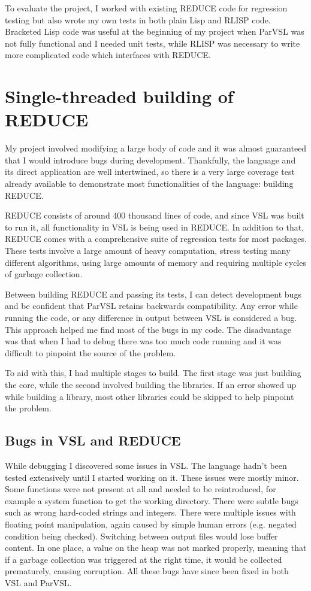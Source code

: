 To evaluate the project, I worked with existing REDUCE code for regression testing
but also wrote my own tests in both plain Lisp and RLISP code.
Bracketed Lisp code was useful at the beginning of my project when ParVSL was not
fully functional and I needed unit tests, while RLISP was necessary to write
more complicated code which interfaces with REDUCE.

\section{Single-threaded building of REDUCE}

My project involved modifying a large body of code and it was almost guaranteed
that I would introduce bugs during development. Thankfully, the language and its
direct application are well intertwined, so there is a very large coverage test already
available to demonstrate most functionalities of the language: building REDUCE.

REDUCE consists of around 400 thousand lines of code, and since VSL was built to
run it, all functionality in VSL is being used in REDUCE. In addition to that,
REDUCE comes with a comprehensive suite of regression tests for most packages.
These tests involve a large amount of heavy computation, stress testing
many different algorithms, using large amounts of memory and requiring multiple cycles
of garbage collection.

Between building REDUCE and passing its tests, I can detect development bugs and be
confident that ParVSL retains backwards compatibility. Any error while running the code,
or any difference in output between VSL is considered a bug. This approach helped me
find most of the bugs in my code. The disadvantage was that when I had to debug there
was too much code running and it was difficult to pinpoint the source of the problem.

To aid with this, I had multiple stages to build. The first stage was just building
the core, while the second involved building the libraries. If an error showed up while
building a library, most other libraries could be skipped to help pinpoint the problem.

\subsection{Bugs in VSL and REDUCE}

While debugging I discovered some issues in VSL. The language hadn't been tested
extensively until I started working on it. These issues were mostly minor. Some functions
were not present at all and needed to be reintroduced, for example a system function to get
the working directory. There were subtle bugs such as wrong
hard-coded strings and integers. There were multiple issues with floating point manipulation,
again caused by simple human errors (e.g. negated condition being checked). Switching between
output files would lose buffer content. In one place, a value on the heap was not marked
properly, meaning that if a garbage collection was triggered at the right time, it would
be collected prematurely, causing corruption. All these bugs have since been fixed
in both VSL and ParVSL.

